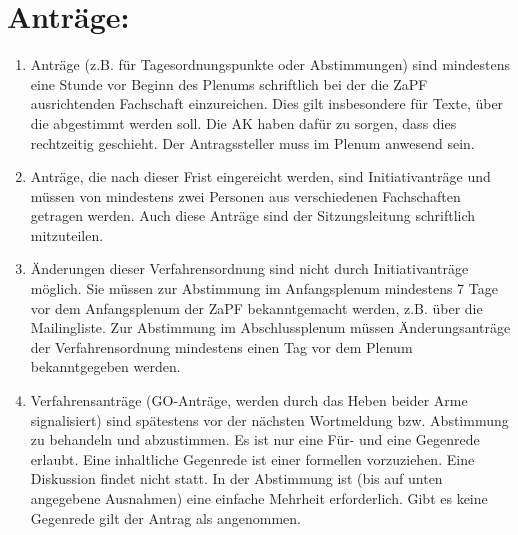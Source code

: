 \noindent
\section*{Anträge:}
\begin{enumerate}
\item{Anträge (z.B. für Tagesordnungspunkte oder Abstimmungen) sind mindestens eine Stunde vor
Beginn des Plenums schriftlich bei der die ZaPF ausrichtenden Fachschaft einzureichen. Dies gilt
insbesondere für Texte, über die abgestimmt werden soll. Die AK haben dafür zu sorgen, dass dies
rechtzeitig geschieht. Der Antragssteller muss im Plenum anwesend sein.}

\item{Anträge, die nach dieser Frist eingereicht werden, sind Initiativanträge und müssen von mindestens
zwei Personen aus verschiedenen Fachschaften getragen werden. Auch diese Anträge sind der
Sitzungsleitung schriftlich mitzuteilen.}

\item{Änderungen dieser Verfahrensordnung sind nicht durch Initiativanträge möglich. Sie müssen zur
Abstimmung im Anfangsplenum mindestens 7 Tage vor dem Anfangsplenum der ZaPF
bekanntgemacht werden, z.B. über die Mailingliste. Zur Abstimmung im Abschlussplenum müssen
Änderungsanträge der Verfahrensordnung mindestens einen Tag vor dem Plenum bekanntgegeben
werden.}

\item{Verfahrensanträge (GO-Anträge, werden durch das Heben beider Arme signalisiert) sind spätestens
vor der nächsten Wortmeldung bzw. Abstimmung zu behandeln und
abzustimmen. Es ist nur eine Für- und eine Gegenrede erlaubt. Eine
inhaltliche Gegenrede ist einer formellen vorzuziehen. Eine
Diskussion findet nicht statt. In der Abstimmung ist (bis auf unten
angegebene Ausnahmen) eine einfache Mehrheit erforderlich. Gibt es
keine Gegenrede gilt der Antrag als angenommen.}



\end{enumerate}
